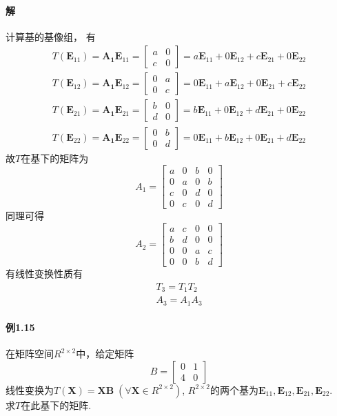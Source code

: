 \documentclass[12pt, a4paper, oneside, fontset=none]{ctexart}
\begin{document}
\paragraph*{解} 计算基的基像组， 有
\begin{gather*}
    T(\bm{E}_{11}) = \bm{A_1}\bm{E}_{11} = \begin{bmatrix}
        a & 0 \\
        c & 0
    \end{bmatrix} = a\bm{E}_{11} + 0\bm{E}_{12} + c\bm{E}_{21} + 0\bm{E}_{22} \\
    T(\bm{E}_{12}) = \bm{A_1}\bm{E}_{12} = \begin{bmatrix}
        0 & a \\
        0 & c
    \end{bmatrix} = 0\bm{E}_{11} + a\bm{E}_{12} + 0\bm{E}_{21} + c\bm{E}_{22} \\
    T(\bm{E}_{21}) = \bm{A_1}\bm{E}_{21} = \begin{bmatrix}
        b & 0 \\
        d & 0
    \end{bmatrix} = b\bm{E}_{11} + 0\bm{E}_{12} + d\bm{E}_{21} + 0\bm{E}_{22} \\
    T(\bm{E}_{22}) = \bm{A_1}\bm{E}_{22} = \begin{bmatrix}
        0 & b \\
        0 & d
    \end{bmatrix} = 0\bm{E}_{11} + b\bm{E}_{12} + 0\bm{E}_{21} + d\bm{E}_{22}
\end{gather*}
故$T$在基下的矩阵为
\[
    A_1 = \begin{bmatrix}
        a & 0 & b & 0 \\
        0 & a & 0 & b \\
        c & 0 & d & 0 \\
        0 & c & 0 & d
    \end{bmatrix}
\]
同理可得
\[
    A_2 = \begin{bmatrix}
        a & c & 0 & 0 \\
        b & d & 0 & 0 \\
        0 & 0 & a & c \\
        0 & 0 & b & d
    \end{bmatrix}
\]
有线性变换性质有
\begin{gather*}
    T_3 = T_1T_2 \\
    A_3 = A_1A_3
\end{gather*}

\paragraph*{例1.15} 在矩阵空间$R^{2\times 2}$中，给定矩阵
\[
    B = \begin{bmatrix}
        0 & 1 \\
        4 & 0
    \end{bmatrix}
\]
线性变换为$T(\bm{X})=\bm{XB}\;(\forall \bm{X} \in R^{2\times 2})$, $R^{2\times 2}$的两个基为$\bm{E}_{11},\bm{E}_{12}, \bm{E}_{21}, \bm{E}_{22}$. \\
求$T$在此基下的矩阵.
\end{document}
